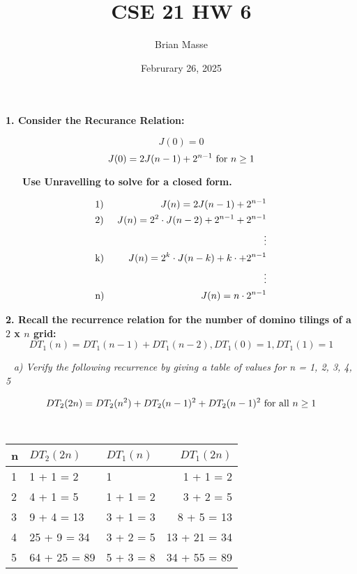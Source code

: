\documentclass[12pt, letterpaper]{article}
\title{CSE 21 HW 6}
\author{Brian Masse}
\date{Februrary 26, 2025}
\begin{document}
\maketitle
\newpage

\bf{ 1. Consider the Recurance Relation: }

\[ J(0) = 0 \]
\[ J(0) = 2J(n - 1) + 2^{n-1} \textnormal{ for } n \ge 1 \]

\-\ \newline
\-\ \bf{ Use Unravelling to solve for a closed form. }

\begin{eqnarray*}
    &\textnormal{1)  }& J(n) = 2J(n - 1) + 2^{n-1} \\
    &\textnormal{2)  }& J(n) = 2^2 \cdot J(n - 2) + 2^{n-1} + 2^{n-1}\\
    &\textnormal{  }& \vdots \\
    &\textnormal{k)  }& J(n) = 2^k \cdot J(n - k) + k \cdot + 2^{n-1}\\
    &\textnormal{  }& \vdots \\
    &\textnormal{n)  }& J(n) = n \cdot 2^{n - 1}\\
\end{eqnarray*}

\newpage
\bf{ 2. Recall the recurrence relation for the number of domino tilings of a \(2\) x \(n\) grid: }
\[  DT_1(n) = DT_1(n - 1) + DT_1(n - 2), DT_1(0) = 1, DT_1(1) = 1 \]

\-\ \newline
\it{ a) Verify the following recurrence by giving a table of values for n = 1, 2, 3, 4, 5 }

\[ DT_2(2n) = DT_2(n^2) + DT_2(n - 1)^2 + DT_2(n - 1)^2 \textnormal{ for all } n \ge 1\]

\-\ \newline
{
\centering
\begin{tabular}{ | l | l | l | r | }
    \hline			
    n & \(DT_2(2n)\) & \(DT_1(n)\) & \(DT_1(2n)\) \\ 
    \hline
    1 & 1 + 1 = 2       & 1             & 1 + 1 = 2 \\
    2 & 4 + 1 = 5       & 1 + 1 = 2     & 3 + 2 = 5 \\ 
    3 & 9 + 4 = 13      & 3 + 1 = 3     & 8 + 5 = 13 \\ 
    4 & 25 + 9 = 34     & 3 + 2 = 5     & 13 + 21 = 34 \\ 
    5 & 64 + 25 = 89    & 5 + 3 = 8     & 34 + 55 = 89 \\
    \hline  
  \end{tabular}\par
}
\end{document}
